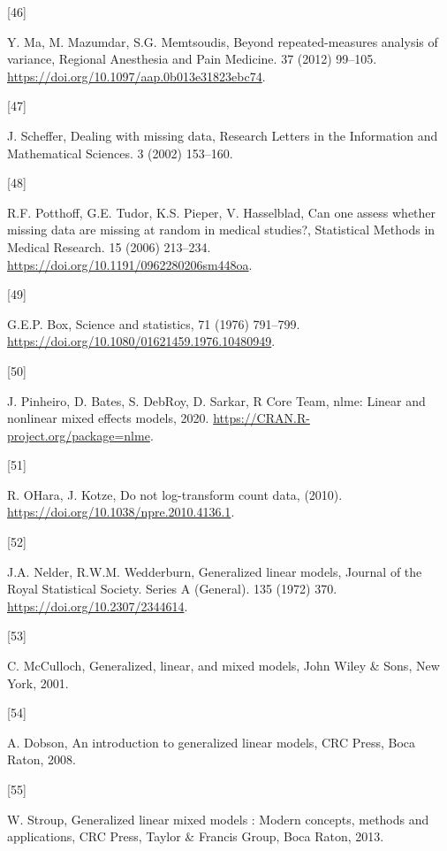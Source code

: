 \documentclass[
]{article}
\newlength{\cslhangindent}
\newlength{\csllabelwidth}
\newlength{\cslentryspacingunit} %
\newenvironment{CSLReferences}[2] %
 {%
  \setlength{\parindent}{0pt}
  \ifodd #1
  \let\oldpar\par
  \def\par{\hangindent=\cslhangindent\oldpar}
  \fi
  \setlength{\parskip}{#2\cslentryspacingunit}
 }%
 {}
\newcommand{\CSLLeftMargin}[1]{\parbox[t]{\csllabelwidth}{#1}}
\newcommand{\CSLRightInline}[1]{\parbox[t]{\linewidth - \csllabelwidth}{#1}\break}
\begin{document}
\begin{CSLReferences}{0}{0}
\leavevmode{}%
\CSLLeftMargin{{[}46{]} }
\CSLRightInline{Y. Ma, M. Mazumdar, S.G. Memtsoudis, Beyond repeated-measures analysis of variance, Regional Anesthesia and Pain Medicine. 37 (2012) 99--105. \url{https://doi.org/10.1097/aap.0b013e31823ebc74}.}

\leavevmode{}%
\CSLLeftMargin{{[}47{]} }
\CSLRightInline{J. Scheffer, Dealing with missing data, Research Letters in the Information and Mathematical Sciences. 3 (2002) 153--160.}

\leavevmode{}%
\CSLLeftMargin{{[}48{]} }
\CSLRightInline{R.F. Potthoff, G.E. Tudor, K.S. Pieper, V. Hasselblad, Can one assess whether missing data are missing at random in medical studies?, Statistical Methods in Medical Research. 15 (2006) 213--234. \url{https://doi.org/10.1191/0962280206sm448oa}.}

\leavevmode{}%
\CSLLeftMargin{{[}49{]} }
\CSLRightInline{G.E.P. Box, Science and statistics, 71 (1976) 791--799. \url{https://doi.org/10.1080/01621459.1976.10480949}.}

\leavevmode{}%
\CSLLeftMargin{{[}50{]} }
\CSLRightInline{J. Pinheiro, D. Bates, S. DebRoy, D. Sarkar, R Core Team, {nlme}: Linear and nonlinear mixed effects models, 2020. \url{https://CRAN.R-project.org/package=nlme}.}

\leavevmode{}%
\CSLLeftMargin{{[}51{]} }
\CSLRightInline{R. OHara, J. Kotze, Do not log-transform count data, (2010). \url{https://doi.org/10.1038/npre.2010.4136.1}.}

\leavevmode{}%
\CSLLeftMargin{{[}52{]} }
\CSLRightInline{J.A. Nelder, R.W.M. Wedderburn, Generalized linear models, Journal of the Royal Statistical Society. Series A (General). 135 (1972) 370. \url{https://doi.org/10.2307/2344614}.}

\leavevmode{}%
\CSLLeftMargin{{[}53{]} }
\CSLRightInline{C. McCulloch, Generalized, linear, and mixed models, John Wiley \& Sons, New York, 2001.}

\leavevmode{}%
\CSLLeftMargin{{[}54{]} }
\CSLRightInline{A. Dobson, An introduction to generalized linear models, CRC Press, Boca Raton, 2008.}

\leavevmode{}%
\CSLLeftMargin{{[}55{]} }
\CSLRightInline{W. Stroup, Generalized linear mixed models : Modern concepts, methods and applications, CRC Press, Taylor \& Francis Group, Boca Raton, 2013.}


\end{CSLReferences}
\end{document}
